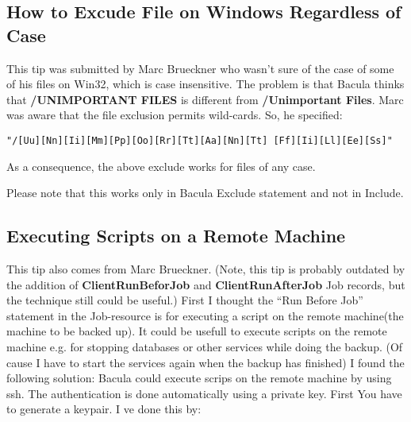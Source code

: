 {\subsection*{How to Excude File on Windows Regardless of Case}
\label{Case}

This tip was submitted by Marc Brueckner who wasn't sure of the case of some
of his files on Win32, which is case insensitive. The problem is that Bacula
thinks that {\bf /UNIMPORTANT FILES} is different from {\bf /Unimportant
Files}. Marc was aware that the file exclusion permits wild-cards. So, he
specified: 

\footnotesize
\begin{verbatim}
"/[Uu][Nn][Ii][Mm][Pp][Oo][Rr][Tt][Aa][Nn][Tt] [Ff][Ii][Ll][Ee][Ss]"
\end{verbatim}
\normalsize

As a consequence, the above exclude works for files of any case. 

Please note that this works only in Bacula Exclude statement and not in
Include. 

\subsection*{Executing Scripts on a Remote Machine}
\label{RemoteExecution}

This tip also comes from Marc Brueckner. (Note, this tip is probably outdated
by the addition of {\bf ClientRunBeforJob} and {\bf ClientRunAfterJob} Job
records, but the technique still could be useful.) First I thought the ``Run
Before Job'' statement in the Job-resource is for executing a script on the
remote machine(the machine to be backed up). It could be usefull to execute
scripts on the remote machine e.g. for stopping databases or other services
while doing the backup. (Of cause I have to start the services again when the
backup has finished) I found the following solution: Bacula could execute
scrips on the remote machine by using ssh. The authentication is done
automatically using a private key. First You have to generate a keypair. I ve
done this by: 

}
